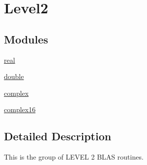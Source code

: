 \hypertarget{group__level2}{}\section{Level2}
\label{group__level2}
\subsection*{Modules}
\begin{DoxyCompactItemize}
\item 
\hyperlink{group__single__blas__level2}{real}
\item 
\hyperlink{group__double__blas__level2}{double}
\item 
\hyperlink{group__complex__blas__level2}{complex}
\item 
\hyperlink{group__complex16__blas__level2}{complex16}
\end{DoxyCompactItemize}


\subsection{Detailed Description}
This is the group of L\+E\+V\+E\+L 2 B\+L\+A\+S routines. 